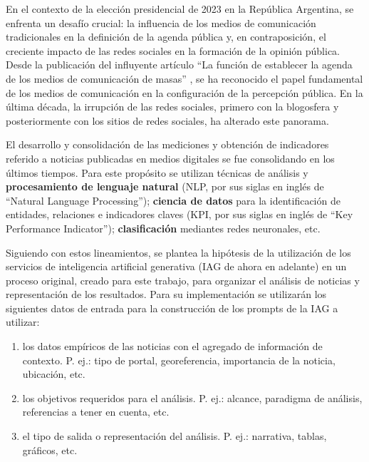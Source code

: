 \documentclass[12pt]{article}
\begin{document}
En el contexto de la elección presidencial de 2023 en la República Argentina, se enfrenta un desafío crucial: la influencia de los medios de comunicación tradicionales en la definición de la agenda pública y, en contraposición, el creciente impacto de las redes sociales en la formación de la opinión pública. Desde la publicación del influyente artículo ``La función de establecer la agenda de los medios de comunicación de masas'' \cite{mccombs:1972}, se ha reconocido el papel fundamental de los medios de comunicación en la configuración de la percepción pública. En la última década, la irrupción de las redes sociales, primero con la blogosfera y posteriormente con los sitios de redes sociales, ha alterado este panorama.


El desarrollo y consolidación de las mediciones y obtención de indicadores referido a noticias publicadas en medios digitales se fue consolidando en los últimos tiempos. Para este propósito se utilizan técnicas de análisis y \textbf{procesamiento de lenguaje natural} (NLP, por sus siglas en inglés de ``Natural Language Processing''); \textbf{ciencia de datos} para la identificación de entidades, relaciones e indicadores claves (KPI, por sus siglas en inglés de ``Key Performance Indicator''); \textbf{clasificación} mediantes redes neuronales, etc. 

Siguiendo con estos lineamientos, se plantea la hipótesis de la utilización de los servicios de inteligencia artificial generativa (IAG de ahora en adelante) en un proceso original, creado para este trabajo, para organizar el análisis de noticias y representación de los resultados. Para su implementación se utilizarán los siguientes datos de entrada para la construcción de los prompts de la IAG a utilizar: 

    \begin{enumerate}
        \item los datos empíricos de las noticias con el agregado de información de contexto. P. ej.:  tipo de portal, georeferencia, importancia de la noticia, ubicación, etc.
        \item los objetivos requeridos para el análisis. P. ej.: alcance, paradigma de análisis, referencias a tener en cuenta, etc.
        \item el tipo de salida o representación del análisis. P. ej.: narrativa, tablas, gráficos, etc.
    \end{enumerate}

\end{document}
